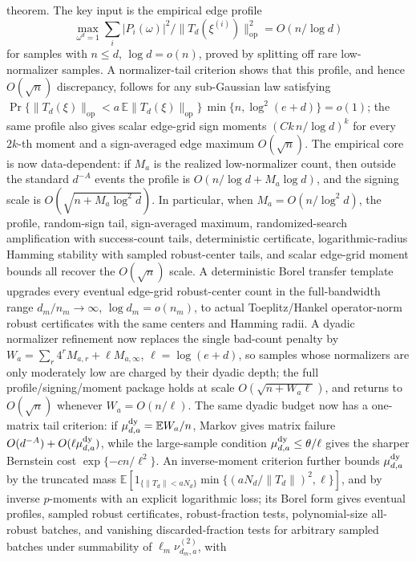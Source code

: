 \documentclass[11pt]{article}
\begin{document}
theorem.  The key input is the empirical edge profile
\[
  \max_{\omega^d=1}\sum_i
  |P_i(\omega)|^2/\|T_d(\xi^{(i)})\|_{\mathrm{op}}^2
  =O(n/\log d)
\]
for samples with \(n\le d\), \(\log d=o(n)\), proved by splitting off rare
low-normalizer samples.  A normalizer-tail criterion shows that this profile,
and hence \(O(\sqrt n)\) discrepancy, follows for any sub-Gaussian law satisfying
\(\Pr\{\|T_d(\xi)\|_{\mathrm{op}}<a\,\mathbb E\|T_d(\xi)\|_{\mathrm{op}}\}
\,\min\{n,\log^2(e+d)\}=o(1)\); the same profile also gives scalar edge-grid sign moments
\((Ck\,n/\log d)^k\) for every \(2k\)-th moment and a sign-averaged edge
maximum \(O(\sqrt n)\).  The empirical core is now data-dependent: if \(M_a\)
is the realized low-normalizer count, then outside the standard \(d^{-A}\)
events the profile is \(O(n/\log d+M_a\log d)\), and the signing scale is
\(O(\sqrt{n+M_a\log^2 d})\).  In particular, when
\(M_a=O(n/\log^2 d)\), the profile, random-sign tail, sign-averaged maximum,
randomized-search amplification with success-count tails, deterministic certificate, logarithmic-radius
Hamming stability with sampled robust-center tails, and scalar edge-grid moment bounds all recover the
\(O(\sqrt n)\) scale.  A deterministic Borel transfer template upgrades every
eventual edge-grid robust-center count in the full-bandwidth range
\(d_m/n_m\to\infty\), \(\log d_m=o(n_m)\), to actual Toeplitz/Hankel
operator-norm robust certificates with the same centers and Hamming radii.  A
dyadic normalizer refinement now replaces the single
bad-count penalty by
\(W_a=\sum_r4^rM_{a,r}+\ell M_{a,\infty}\), \(\ell=\log(e+d)\), so samples
whose normalizers are only moderately low are charged by their dyadic depth;
the full profile/signing/moment package holds at scale
\(O(\sqrt{n+W_a\ell})\), and returns to \(O(\sqrt n)\) whenever
\(W_a=O(n/\ell)\).  The same dyadic budget now has a one-matrix tail
criterion: if \(\mu_{d,a}^{\rm dy}=\mathbb E W_a/n\), Markov gives matrix
failure \(O(d^{-A})+O(\ell\mu_{d,a}^{\rm dy})\), while the large-sample
condition \(\mu_{d,a}^{\rm dy}\le\theta/\ell\) gives the sharper Bernstein
cost \(\exp\{-c n/\ell^2\}\).  An inverse-moment criterion further bounds
\(\mu_{d,a}^{\rm dy}\) by the truncated mass
\(\mathbb E[1_{\{\|T_d\|<aN_d\}}\min\{(aN_d/\|T_d\|)^2,\ell\}]\), and by
inverse \(p\)-moments with an explicit logarithmic loss; its Borel form gives
eventual profiles, sampled robust certificates, robust-fraction tests,
polynomial-size all-robust batches, and vanishing discarded-fraction tests for
arbitrary sampled batches under summability of \(\ell_m\nu_{d_m,a}^{(2)}\), with
\end{document}
